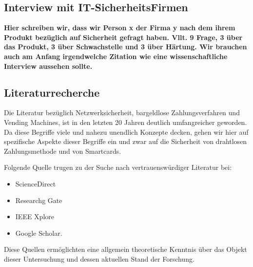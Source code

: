 \subsection{Interview mit IT-SicherheitsFirmen}

\textbf{Hier schreiben wir, dass wir Person x der Firma y nach dem ihrem Produkt bezüglich auf Sicherheit gefragt haben.
Vllt. 9 Frage, 3 über das Produkt, 3 über Schwachstelle und 3 über Härtung. Wir brauchen auch am Anfang irgendwelche Zitation
wie eine wissenschaftliche Interview aussehen sollte.}

\subsection{Literaturrecherche}

Die Literatur bezüglich Netzwerksicherheit, bargeldlose Zahlungsverfahren und Vending Machines, ist in den 
letzten 20 Jahren deutlich umfangreicher geworden. Da diese Begriffe viele und nahezu unendlich Konzepte 
decken, gehen wir hier auf spezifische Aspekte dieser Begriffe ein und zwar auf die Sicherheit von drahtlosen 
Zahlungsmethode und von Smartcards. 

Folgende Quelle trugen zu der Suche nach vertrauenswürdiger Literatur bei:

\begin{itemize}
    \item ScienceDirect
    \item Researchg Gate
    \item IEEE Xplore
    \item Google Scholar.
\end{itemize}

Diese Quellen ermöglichten eine allgemein theoretische Kenntnis über das Objekt dieser Untersuchung und dessen aktuellen 
Stand der Forschung.